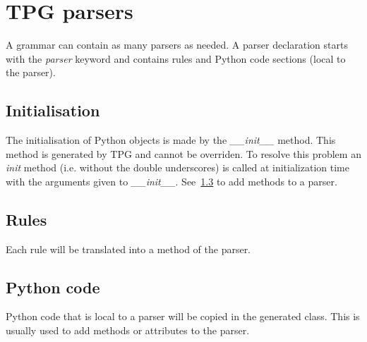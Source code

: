 \section{TPG parsers}										\label{grammar:parser}

A grammar can contain as many parsers as needed.
A parser declaration starts with the \emph{parser} keyword and contains rules and Python code sections (local to the parser).

\subsection{Initialisation}

The initialisation of Python objects is made by the \emph{\_\_init\_\_} method.
This method is generated by TPG and cannot be overriden.
To resolve this problem an \emph{init} method (i.e. without the double underscores) is called at initialization time with the arguments given to \emph{\_\_init\_\_}.
See~\ref{grammar:python_code} to add methods to a parser.

\subsection{Rules}

Each rule will be translated into a method of the parser.

\subsection{Python code}									\label{grammar:python_code}

Python code that is local to a parser will be copied in the generated class.
This is usually used to add methods or attributes to the parser.
